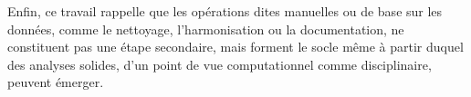 \documentclass[final, fra]{anthology-ch}     %
\begin{document}
Enfin, ce travail rappelle que les opérations dites \og manuelles \fg{} ou de base sur les données, comme le nettoyage, l'harmonisation ou la documentation, ne constituent pas une étape secondaire, mais forment le socle même à partir duquel des analyses solides, d'un point de vue computationnel comme disciplinaire, peuvent émerger.


\printbibliography

\appendix
\end{document}
